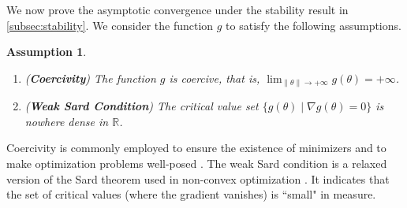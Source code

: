 \documentclass[standalone]{article}
\newtheorem{assumpt}{Assumption}[section]
\begin{document}
We now prove the asymptotic convergence under the stability result in \cref{subsec:stability}. We consider the function $g$ to satisfy the following assumptions.
\begin{assumpt}\label{extra}
\begin{enumerate}[label=\textnormal{(\roman*)}, leftmargin=*]
\item\label{extra:i1} (\textbf{Coercivity}) The function $g$ is coercive, that is, $\lim_{\|\theta\|\rightarrow+\infty} g(\theta) = +\infty$.
\item\label{extra:i2} (\textbf{Weak Sard Condition}) The critical value set $\{g(\theta) \mid \nabla g(\theta) = 0\}$ is nowhere dense in $\mathbb{R}$.
\end{enumerate}
\end{assumpt}
Coercivity is commonly employed to ensure the existence of minimizers and to make optimization problems well-posed \citep{rockafellar1970convex}. The weak Sard condition is a relaxed version of the Sard theorem used in non-convex optimization \citep{clarke1990optimization}. It indicates that the set of critical values (where the gradient vanishes) is ``small" in measure. %
\end{document}
